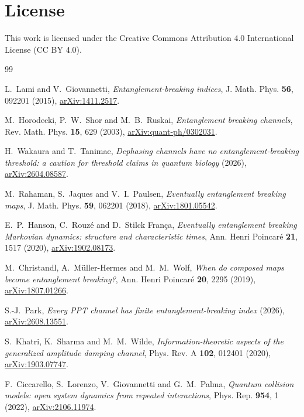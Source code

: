 \documentclass[11pt,a4paper]{article}
\theoremstyle{definition}
\theoremstyle{remark}
\begin{document}
\section*{License}
This work is licensed under the Creative Commons Attribution 4.0 International
License (CC BY 4.0).


\begin{thebibliography}{99}

 L.~Lami and V.~Giovannetti,
\emph{Entanglement-breaking indices}, J. Math. Phys. \textbf{56}, 092201 (2015),
\href{https://arxiv.org/abs/1411.2517}{arXiv:1411.2517}.

 M.~Horodecki, P.~W.~Shor and M.~B.~Ruskai,
\emph{Entanglement breaking channels}, Rev. Math. Phys. \textbf{15}, 629 (2003),
\href{https://arxiv.org/abs/quant-ph/0302031}{arXiv:quant-ph/0302031}.

 H.~Wakaura and T.~Tanimae,
\emph{Dephasing channels have no entanglement-breaking threshold: a caution for threshold claims in quantum biology} (2026),
\href{https://arxiv.org/abs/2604.08587}{arXiv:2604.08587}.

 M.~Rahaman, S.~Jaques and V.~I.~Paulsen,
\emph{Eventually entanglement breaking maps}, J. Math. Phys. \textbf{59}, 062201 (2018),
\href{https://arxiv.org/abs/1801.05542}{arXiv:1801.05542}.

 E.~P.~Hanson, C.~Rouz\'e and D.~Stilck Fran\c{c}a,
\emph{Eventually entanglement breaking Markovian dynamics: structure and characteristic times}, Ann. Henri Poincar\'e \textbf{21}, 1517 (2020),
\href{https://arxiv.org/abs/1902.08173}{arXiv:1902.08173}.

 M.~Christandl, A.~M\"uller-Hermes and M.~M.~Wolf,
\emph{When do composed maps become entanglement breaking?}, Ann. Henri Poincar\'e \textbf{20}, 2295 (2019),
\href{https://arxiv.org/abs/1807.01266}{arXiv:1807.01266}.

 S.-J.~Park,
\emph{Every PPT channel has finite entanglement-breaking index} (2026),
\href{https://arxiv.org/abs/2608.13551}{arXiv:2608.13551}.

 S.~Khatri, K.~Sharma and M.~M.~Wilde,
\emph{Information-theoretic aspects of the generalized amplitude damping channel}, Phys. Rev. A \textbf{102}, 012401 (2020),
\href{https://arxiv.org/abs/1903.07747}{arXiv:1903.07747}.

 F.~Ciccarello, S.~Lorenzo, V.~Giovannetti and G.~M.~Palma,
\emph{Quantum collision models: open system dynamics from repeated interactions}, Phys. Rep. \textbf{954}, 1 (2022),
\href{https://arxiv.org/abs/2106.11974}{arXiv:2106.11974}.


\end{thebibliography}
\end{document}
